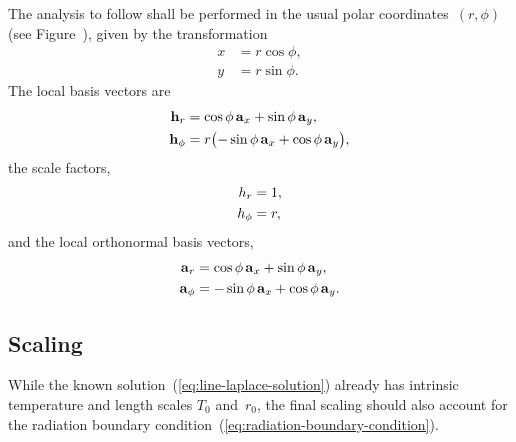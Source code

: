 The analysis to follow shall be performed
in the usual polar coordinates~$(r, \phi)$
(see Figure~\tbd),
given by the transformation
\begin{align}
  x &= r \cos\phi, \label{eq:x-transformation-polar} \\
  y &= r \sin\phi. \label{eq:y-transformation-polar}
\end{align}
The local basis vectors are
\begin{align}
  \localvec{r} &=
    \cos\phi \basisvec{x} + \sin\phi \basisvec{y},
    \label{eq:r-local-basis-vector} \\
  \localvec{\phi} &=
    r \roundbr[\big]{-\sin\phi \basisvec{x} + \cos\phi \basisvec{y}},
    \label{eq:phi-local-basis-vector}
\end{align}
the scale factors,
\begin{align}
  \scalefac[r] &= 1, \label{eq:r-scale-factor} \\
  \scalefac[\phi] &= r, \label{eq:phi-scale-factor}
\end{align}
and the local orthonormal basis vectors,
\begin{align}
  \basisvec{r} &= \cos\phi \basisvec{x} + \sin\phi \basisvec{y},
    \label{eq:r-basis-vector} \\
  \basisvec{\phi} &= -\sin\phi \basisvec{x} + \cos\phi \basisvec{y}.
    \label{eq:phi-basis-vector}
\end{align}

\subsection{Scaling}
\label{sec:polar.line.scaling}

While the known solution~(\ref{eq:line-laplace-solution})
already has intrinsic temperature and length scales $T_0$ and~$r_0$,
the final scaling should also account for
the radiation boundary condition~(\ref{eq:radiation-boundary-condition}).

